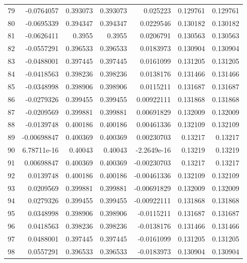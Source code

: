 \begin{tabular}{rrrrrrr}
  79 & -0.0764057   & 0.393073    & 0.393073    &  0.025223    & 0.129761    & 0.129761    \\
  80 & -0.0695339   & 0.394347    & 0.394347    &  0.0229546   & 0.130182    & 0.130182    \\
  81 & -0.0626411   & 0.3955      & 0.3955      &  0.0206791   & 0.130563    & 0.130563    \\
  82 & -0.0557291   & 0.396533    & 0.396533    &  0.0183973   & 0.130904    & 0.130904    \\
  83 & -0.0488001   & 0.397445    & 0.397445    &  0.0161099   & 0.131205    & 0.131205    \\
  84 & -0.0418563   & 0.398236    & 0.398236    &  0.0138176   & 0.131466    & 0.131466    \\
  85 & -0.0348998   & 0.398906    & 0.398906    &  0.0115211   & 0.131687    & 0.131687    \\
  86 & -0.0279326   & 0.399455    & 0.399455    &  0.00922111  & 0.131868    & 0.131868    \\
  87 & -0.0209569   & 0.399881    & 0.399881    &  0.00691829  & 0.132009    & 0.132009    \\
  88 & -0.0139748   & 0.400186    & 0.400186    &  0.00461336  & 0.132109    & 0.132109    \\
  89 & -0.00698847  & 0.400369    & 0.400369    &  0.00230703  & 0.13217     & 0.13217     \\
  90 &  6.78711e-16 & 0.40043     & 0.40043     & -2.2649e-16  & 0.13219     & 0.13219     \\
  91 &  0.00698847  & 0.400369    & 0.400369    & -0.00230703  & 0.13217     & 0.13217     \\
  92 &  0.0139748   & 0.400186    & 0.400186    & -0.00461336  & 0.132109    & 0.132109    \\
  93 &  0.0209569   & 0.399881    & 0.399881    & -0.00691829  & 0.132009    & 0.132009    \\
  94 &  0.0279326   & 0.399455    & 0.399455    & -0.00922111  & 0.131868    & 0.131868    \\
  95 &  0.0348998   & 0.398906    & 0.398906    & -0.0115211   & 0.131687    & 0.131687    \\
  96 &  0.0418563   & 0.398236    & 0.398236    & -0.0138176   & 0.131466    & 0.131466    \\
  97 &  0.0488001   & 0.397445    & 0.397445    & -0.0161099   & 0.131205    & 0.131205    \\
  98 &  0.0557291   & 0.396533    & 0.396533    & -0.0183973   & 0.130904    & 0.130904    \\

\end{tabular}

